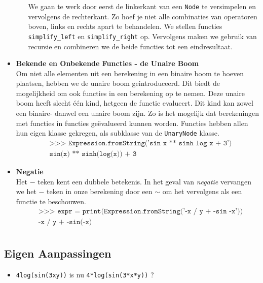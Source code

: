 \documentclass[12pt]{article}
\begin{document}
\begin{itemize}
\begin{itemize}
We gaan te werk door eerst de linkerkant van een \texttt{Node} te versimpelen en vervolgens de rechterkant. Zo hoef je niet alle combinaties van operatoren boven, links en rechts apart te behandelen. We stellen functies \texttt{simplify\_left} en \texttt{simplify\_right} op. Vervolgens maken we gebruik van recursie en combineren we de beide functies tot een eindresultaat. 
\end{itemize}
\vspace{1pc}
\item \textbf{Bekende en Onbekende Functies - de Unaire Boom} \\
Om niet alle elementen uit een berekening in een binaire boom te hoeven plaatsen, hebben we de unaire boom geintroduceerd. Dit biedt de mogelijkheid om ook functies in een berekening op te nemen. Deze unaire boom heeft slecht \'e\'en kind, hetgeen de functie evalueert. Dit kind kan zowel een binaire- danwel een unaire boom zijn. Zo is het mogelijk dat berekeningen met functies in functies ge\"evalueerd kunnen worden. Functies hebben allen hun eigen klasse gekregen, als subklasse van de \texttt{UnaryNode} klasse.
\begin{align*}
&\texttt{>>> Expression.fromString('sin x ** sinh log x + 3')}\\
&\texttt{sin(x) ** sinh(log(x)) + 3}
\end{align*}

\item \textbf{Negatie} \\
Het $-$ teken kent een dubbele betekenis. In het geval van \textit{negatie} vervangen we het $-$ teken in onze berekening door een $\sim$ om het vervolgens als een functie te beschouwen. 
\begin{align*}
&\texttt{>>> expr =  print(Expression.fromString('-x / y + -sin -x'))}\\
&\texttt{-x / y + -sin(-x)}\\
\end{align*}
\end{itemize}

\subsection*{Eigen Aanpassingen}
\begin{itemize}
\item \texttt{4log(sin(3xy))} is nu \texttt{4*log(sin(3*x*y))} ?
\end{itemize}
\end{document}
